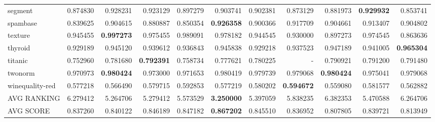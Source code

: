 \begin{tabular}{lrrrrrrrrrr}
segment         &   0.874830 &  0.928231 &  0.923129 &  0.897279 &  0.903741 &  0.902381 &  0.873129 &  0.881973 &  \textbf{0.929932} &  0.853741 \\
spambase        &   0.839625 &  0.904615 &  0.880887 &  0.850354 &  \textbf{0.926358} &  0.900366 &  0.917709 &  0.904661 &  0.913407 &  0.904802 \\
texture         &   0.945455 &  \textbf{0.997273} &  0.975455 &  0.989091 &  0.978182 &  0.944545 &  0.930000 &  0.897273 &  0.974545 &  0.863636 \\
thyroid         &   0.929189 &  0.945120 &  0.939612 &  0.936843 &  0.945838 &  0.929218 &  0.937523 &  0.947189 &  0.941005 &  \textbf{0.965304} \\
titanic         &   0.752960 &  0.781680 &  \textbf{0.792391} &  0.758734 &  0.777621 &  0.780225 &       - &  0.790921 &  0.791200 &  0.791480 \\
twonorm         &   0.970973 &  \textbf{0.980424} &  0.973000 &  0.971653 &  0.980419 &  0.979739 &  0.979068 &  \textbf{0.980424} &  0.975041 &  0.979068 \\
winequality-red &   0.577218 &  0.566490 &  0.579715 &  0.592853 &  0.577219 &  0.580202 &  \textbf{0.594672} &  0.559080 &  0.581577 &  0.562882 \\
\bottomrule
AVG RANKING & 6.279412 & 5.264706 & 5.279412 & 5.573529 & \textbf{3.250000} & 5.397059 & 5.838235 & 6.382353 & 5.470588 & 6.264706 \\
AVG SCORE & 0.837260 & 0.840122 & 0.846189 & 0.847182 & \textbf{0.867202} & 0.845510 & 0.836952 & 0.807805 & 0.839721 & 0.813949 \\
\end{tabular}
